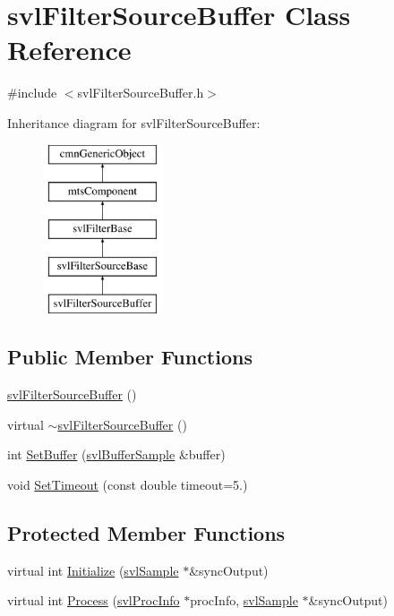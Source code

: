 \hypertarget{classsvl_filter_source_buffer}{}\section{svl\+Filter\+Source\+Buffer Class Reference}
\label{classsvl_filter_source_buffer}


{\ttfamily \#include $<$svl\+Filter\+Source\+Buffer.\+h$>$}

Inheritance diagram for svl\+Filter\+Source\+Buffer\+:\begin{figure}[H]
\begin{center}
\leavevmode
\includegraphics[height=5.000000cm]{dc/d20/classsvl_filter_source_buffer}
\end{center}
\end{figure}
\subsection*{Public Member Functions}
\begin{DoxyCompactItemize}
\item 
\hyperlink{classsvl_filter_source_buffer_a6cd7955d0b549b7cd6b0851f5cad3c25}{svl\+Filter\+Source\+Buffer} ()
\item 
virtual \hyperlink{classsvl_filter_source_buffer_ab697409a667729e549ec37e669c04d78}{$\sim$svl\+Filter\+Source\+Buffer} ()
\item 
int \hyperlink{classsvl_filter_source_buffer_a1aa99d859b80c0d1d141e2966c7c5a3e}{Set\+Buffer} (\hyperlink{classsvl_buffer_sample}{svl\+Buffer\+Sample} \&buffer)
\item 
void \hyperlink{classsvl_filter_source_buffer_af34e57ac8e5d500c62c75fe8bca206a5}{Set\+Timeout} (const double timeout=5.)
\end{DoxyCompactItemize}
\subsection*{Protected Member Functions}
\begin{DoxyCompactItemize}
\item 
virtual int \hyperlink{classsvl_filter_source_buffer_a671424826b177c6e4f343a453463a4cb}{Initialize} (\hyperlink{classsvl_sample}{svl\+Sample} $\ast$\&sync\+Output)
\item 
virtual int \hyperlink{classsvl_filter_source_buffer_acf23afc3f5fc22cb8da65664766d6bf0}{Process} (\hyperlink{structsvl_proc_info}{svl\+Proc\+Info} $\ast$proc\+Info, \hyperlink{classsvl_sample}{svl\+Sample} $\ast$\&sync\+Output)
\end{DoxyCompactItemize}
